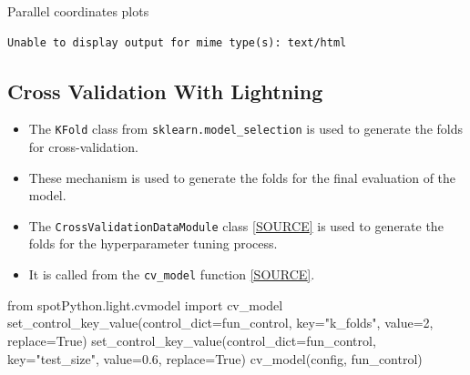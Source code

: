 \documentclass[
  letterpaper,
  DIV=11,
  numbers=noendperiod]{scrreprt}
\newenvironment{Shaded}{\begin{snugshade}}{\end{snugshade}}
\newcommand{\DecValTok}[1]{\textcolor[rgb]{0.68,0.00,0.00}{#1}}
\newcommand{\FloatTok}[1]{\textcolor[rgb]{0.68,0.00,0.00}{#1}}
\newcommand{\ImportTok}[1]{\textcolor[rgb]{0.00,0.46,0.62}{#1}}
\newcommand{\NormalTok}[1]{\textcolor[rgb]{0.00,0.23,0.31}{#1}}
\newcommand{\OperatorTok}[1]{\textcolor[rgb]{0.37,0.37,0.37}{#1}}
\newcommand{\StringTok}[1]{\textcolor[rgb]{0.13,0.47,0.30}{#1}}
\newcommand{\VariableTok}[1]{\textcolor[rgb]{0.07,0.07,0.07}{#1}}
\providecommand{\tightlist}{%
  \setlength{\itemsep}{0pt}\setlength{\parskip}{0pt}}\usepackage{longtable,booktabs,array}
\begin{document}
Parallel coordinates plots

\begin{verbatim}
Unable to display output for mime type(s): text/html
\end{verbatim}

\subsection{Cross Validation With
Lightning}\label{cross-validation-with-lightning}

\begin{itemize}
\tightlist
\item
  The \texttt{KFold} class from \texttt{sklearn.model\_selection} is
  used to generate the folds for cross-validation.
\item
  These mechanism is used to generate the folds for the final evaluation
  of the model.
\item
  The \texttt{CrossValidationDataModule} class
  \href{https://github.com/sequential-parameter-optimization/spotPython/blob/main/src/spotPython/data/lightcrossvalidationdatamodule.py}{{[}SOURCE{]}}
  is used to generate the folds for the hyperparameter tuning process.
\item
  It is called from the \texttt{cv\_model} function
  \href{https://github.com/sequential-parameter-optimization/spotPython/blob/main/src/spotPython/light/cvmodel.py}{{[}SOURCE{]}}.
\end{itemize}

\begin{Shaded}
\begin{Highlighting}[]
\ImportTok{from}\NormalTok{ spotPython.light.cvmodel }\ImportTok{import}\NormalTok{ cv\_model}
\NormalTok{set\_control\_key\_value(control\_dict}\OperatorTok{=}\NormalTok{fun\_control,}
\NormalTok{                        key}\OperatorTok{=}\StringTok{"k\_folds"}\NormalTok{,}
\NormalTok{                        value}\OperatorTok{=}\DecValTok{2}\NormalTok{,}
\NormalTok{                        replace}\OperatorTok{=}\VariableTok{True}\NormalTok{)}
\NormalTok{set\_control\_key\_value(control\_dict}\OperatorTok{=}\NormalTok{fun\_control,}
\NormalTok{                        key}\OperatorTok{=}\StringTok{"test\_size"}\NormalTok{,}
\NormalTok{                        value}\OperatorTok{=}\FloatTok{0.6}\NormalTok{,}
\NormalTok{                        replace}\OperatorTok{=}\VariableTok{True}\NormalTok{)}
\NormalTok{cv\_model(config, fun\_control)}
\end{Highlighting}
\end{Shaded}
\end{document}
